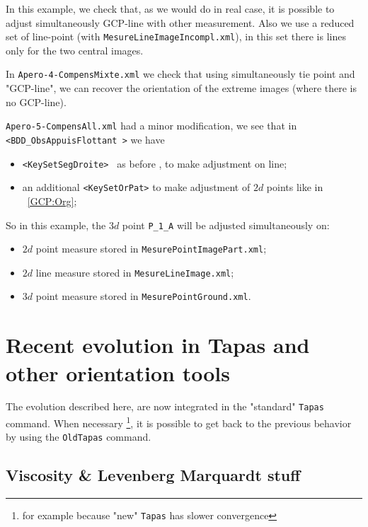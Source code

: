 In this example, we check that, as we would do in real case, it is possible to adjust simultaneously GCP-line with
other measurement. Also we use a reduced set of line-point (with {\tt MesureLineImageIncompl.xml}), in this set
there is lines only for the two central images.

In {\tt Apero-4-CompensMixte.xml} we check that using simultaneously tie point and "GCP-line", we can recover the orientation
of the extreme images (where there is no GCP-line).

{\tt  Apero-5-CompensAll.xml} had a minor modification, we see that in {\tt <BDD\_ObsAppuisFlottant >} we have

\begin{itemize}
   \item  {\tt <KeySetSegDroite> } as before , to make adjustment on line;
   \item an additional {\tt  <KeySetOrPat>} to make adjustment of $2d$ points like in  ~\ref{GCP:Org};

\end{itemize}

So in this example, the $3d$ point {\tt P\_1\_A} will be adjusted simultaneously on:

\begin{itemize}
    \item $2d$ point measure stored in {\tt MesurePointImagePart.xml};
    \item $2d$ line measure stored in {\tt MesureLineImage.xml};
    \item $3d$ point measure stored in {\tt MesurePointGround.xml}.
\end{itemize}

\section{Recent evolution in Tapas and other orientation tools}

The evolution described here, are now integrated in the "standard" {\tt Tapas} command.
When necessary \footnote{for example because "new"  {\tt Tapas} has slower convergence}, it is possible
to get back to the previous behavior by using the {\tt OldTapas} command.




\subsection{Viscosity \& Levenberg Marquardt stuff}

